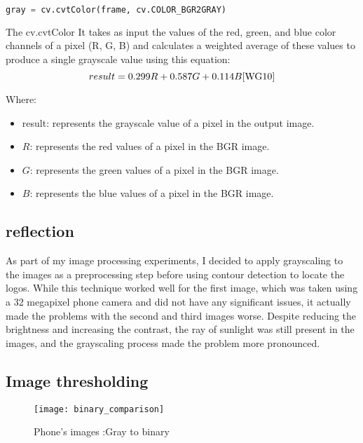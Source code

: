 \FloatBarrier 
\begin{lstlisting}[language=Python]
 gray = cv.cvtColor(frame, cv.COLOR_BGR2GRAY)
\end{lstlisting}
The cv.cvtColor It takes as input the values of the red, green, and blue color channels of a pixel (R, G, B) and calculates a weighted average of these values to produce a single grayscale value using this equation:\cite{WG10}
\begin{equation}
result = 0.299 R + 0.587 G + 0.114 B \cite{WG10}
\end{equation}

Where:

\begin{itemize}
\item result: represents the grayscale value of a pixel in the output image.
\item $R$: represents the red values of a pixel in the BGR image.
\item $G$: represents the green values of a pixel in the BGR image.
\item $B$: represents the blue values of a pixel in the BGR image.
\end{itemize}

\subsection{reflection}
As part of my image processing experiments, I decided to apply grayscaling to the images as a preprocessing step before using contour detection to locate the logos. While this technique worked well for the first image, which was taken using a 32 megapixel phone camera and did not have any significant issues, it actually made the problems with the second and third images worse. Despite reducing the brightness and increasing the contrast, the ray of sunlight was still present in the images, and the grayscaling process made the problem more pronounced.
\subsection{Image thresholding}

\FloatBarrier
\begin{figure}[h]
\FloatBarrier
         \centering
        \texttt{[image: binary\_comparison]}
   
        \caption{Phone's images :Gray to binary}
        \label{fig:Phone's images : Gray to binary}
\FloatBarrier
    \end{figure}


